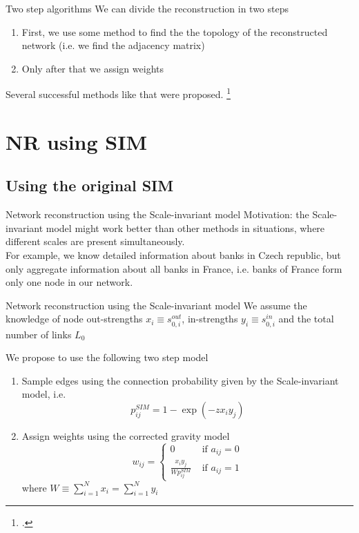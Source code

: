 \documentclass{beamer}
\begin{document}
\begin{frame}{Two step algorithms}
    We can divide the reconstruction in two steps
    \begin{enumerate}
        \item First, we use some method to find the the topology of the reconstructed network (i.e. we find the adjacency matrix)
        \item Only after that we assign weights
    \end{enumerate}
    Several successful methods like that were proposed. \footcite{Squartini2018}
\end{frame}

\section{NR using SIM}
\subsection{Using the original SIM}
\begin{frame}{Network reconstruction using the Scale-invariant model}
Motivation: the Scale-invariant model might work better than other methods in situations, where different scales are present simultaneously.\\
\vspace{30px}
For example, we know detailed information about banks in Czech republic, but only aggregate information about all banks in France, i.e. banks of France form only one node in our network.
\end{frame}
\begin{frame}{Network reconstruction using the Scale-invariant model}
We assume the knowledge of node out-strengths $x_i \equiv s_{0,i}^{out}$, in-strengths $y_i \equiv s_{0,i}^{in}$ and the total number of links $L_0$


We propose to use the following two step model
    \begin{enumerate}
        \item Sample edges using the connection probability given by the Scale-invariant model, i.e.
        \begin{equation*}
            p_{ij}^{SIM} = 1 - \exp(-zx_i y_j)
        \end{equation*}
        \item Assign weights using the corrected gravity model \begin{equation}
        w_{ij} = \begin{cases}
            0 \qquad &\text{if } a_{ij} = 0\\
            \frac{x_i y_j}{W p_{ij}^{SIM}} &\text{if } a_{ij} = 1
        \end{cases}    
    \end{equation}
    where $W \equiv \sum_{i=1}^N x_i =  \sum_{i=1}^N y_i$
    \end{enumerate}
\end{frame}
\end{document}
